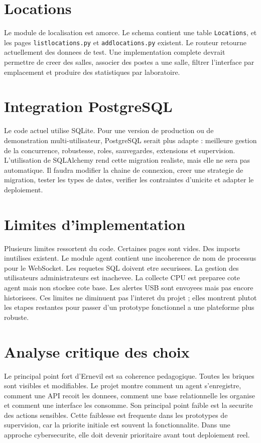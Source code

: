 \documentclass[12pt,a4paper]{report}
\begin{document}
\section{Locations}
Le module de localisation est amorce. Le schema contient une table \texttt{Locations}, et les pages \texttt{listlocations.py} et \texttt{addlocations.py} existent. Le routeur retourne actuellement des donnees de test. Une implementation complete devrait permettre de creer des salles, associer des postes a une salle, filtrer l'interface par emplacement et produire des statistiques par laboratoire.

\section{Integration PostgreSQL}
Le code actuel utilise SQLite. Pour une version de production ou de demonstration multi-utilisateur, PostgreSQL serait plus adapte : meilleure gestion de la concurrence, robustesse, roles, sauvegardes, extensions et supervision. L'utilisation de SQLAlchemy rend cette migration realiste, mais elle ne sera pas automatique. Il faudra modifier la chaine de connexion, creer une strategie de migration, tester les types de dates, verifier les contraintes d'unicite et adapter le deploiement.

\section{Limites d'implementation}
Plusieurs limites ressortent du code. Certaines pages sont vides. Des imports inutilises existent. Le module agent contient une incoherence de nom de processus pour le WebSocket. Les requetes SQL doivent etre securisees. La gestion des utilisateurs administrateurs est inachevee. La collecte CPU est preparee cote agent mais non stockee cote base. Les alertes USB sont envoyees mais pas encore historisees. Ces limites ne diminuent pas l'interet du projet ; elles montrent plutot les etapes restantes pour passer d'un prototype fonctionnel a une plateforme plus robuste.

\section{Analyse critique des choix}
Le principal point fort d'Ernevil est sa coherence pedagogique. Toutes les briques sont visibles et modifiables. Le projet montre comment un agent s'enregistre, comment une API recoit les donnees, comment une base relationnelle les organise et comment une interface les consomme. Son principal point faible est la securite des actions sensibles. Cette faiblesse est frequente dans les prototypes de supervision, car la priorite initiale est souvent la fonctionnalite. Dans une approche cybersecurite, elle doit devenir prioritaire avant tout deploiement reel.
\end{document}
